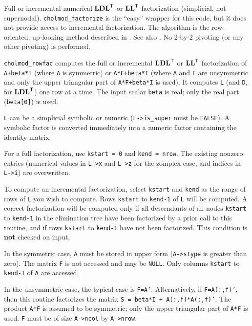 \documentclass[11pt]{article}
\newcommand{\m}[1]{{\bf{#1}}}       %
\newcommand{\tr}{^{\sf T}}          %
\begin{document}

Full or incremental numerical $\m{LDL}\tr$ or $\m{LL}\tr$ factorization (simplicial, not
supernodal).  {\tt cholmod\_factorize} is the ``easy'' wrapper for this code, but it
does not provide access to incremental factorization.
The algorithm is the row-oriented, up-looking method described in \cite{Davis05}.
See also \cite{Liu86c}.  No 2-by-2 pivoting (or any other pivoting) is performed.

{\tt cholmod\_rowfac} computes the full or incremental $\m{LDL}\tr$ or $\m{LL}\tr$ factorization of
{\tt A+beta*I} (where {\tt A} is symmetric) or {\tt A*F+beta*I}
(where {\tt A} and {\tt F} are unsymmetric
and only the upper triangular part of {\tt A*F+beta*I} is used).  It computes
{\tt L} (and {\tt D}, for $\m{LDL}\tr$) one row at a time.
The input scalar {\tt beta} is real; only the real part ({\tt beta[0]}) is used.

{\tt L} can be a simplicial symbolic or numeric ({\tt L->is\_super} must be {\tt FALSE}).
A symbolic factor is converted immediately into a numeric factor containing
the identity matrix.

For a full factorization, use {\tt kstart = 0} and {\tt kend = nrow}.  The existing nonzero
entries (numerical values in {\tt L->x} and {\tt L->z} for the zomplex case, and indices
in {\tt L->i}) are overwritten.

To compute an incremental factorization, select {\tt kstart} and {\tt kend} as the range
of rows of {\tt L} you wish to compute.    Rows {\tt kstart} to {\tt kend-1} of {\tt L}
will be computed.  A correct factorization will be computed
only if all descendants of all nodes {\tt kstart} to {\tt kend-1} in the elimination tree have
been factorized by a prior call to this routine, and if rows {\tt kstart} to {\tt kend-1}
have not been factorized.  This condition is {\bf not} checked on input.

In the symmetric case, {\tt A} must be stored in upper form ({\tt A->stype} is greater than zero).
The matrix {\tt F} is not accessed and may be {\tt NULL}.  Only
columns {\tt kstart} to {\tt kend-1} of {\tt A} are accessed.

In the unsymmetric case,
	the typical case is {\tt F=A'}.  Alternatively, if {\tt F=A(:,f)'}, then this
	routine factorizes the matrix {\tt S = beta*I + A(:,f)*A(:,f)'}.
	The product {\tt A*F} is assumed to be symmetric;
	only the upper triangular part of {\tt A*F} is used.
	{\tt F} must be of size {\tt A->ncol} by {\tt A->nrow}.

\end{document}
